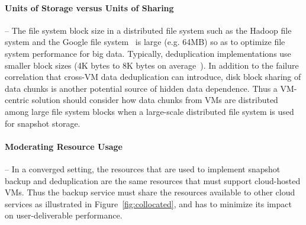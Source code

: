{%
\paragraph*{Units of Storage versus Units of Sharing} --
The file system block  size in a distributed file system such as  
the Hadoop file system and the Google file system~\cite{googlefs03}
is large (e.g.  64MB) so as to optimize file system performance
for big data.
Typically, deduplication implementations use smaller block sizes (4K bytes to
8K bytes on average~\cite{Jin2009}).
In addition to the failure correlation that cross-VM data deduplication can
introduce, disk block sharing of data chunks is another potential source of
hidden data dependence.
Thus a VM-centric solution should consider how data chunks from VMs are
distributed among large file system blocks when a large-scale distributed file
system is used for snapshot storage.

 

\paragraph*{Moderating Resource Usage} --
In a converged setting, the resources that are used to implement snapshot
backup and deduplication are the same resources that must support cloud-hosted
VMs.  Thus the backup service must share the resources available to
other cloud services as illustrated in Figure~\ref{fig:collocated},
and has to minimize its impact on user-deliverable performance.

}

